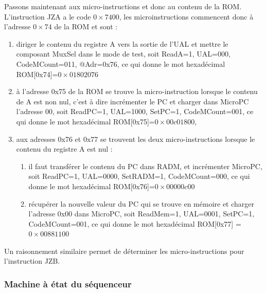 Passons maintenant aux micro-instructions et donc au contenu de la ROM. L'instruction JZA a le code $0\times 7400$, les microinstructions commencent donc à l'adresse $0\times74$ de la ROM et sont :
\begin{enumerate}
\item diriger le contenu du registre A vers la sortie de l'UAL et mettre le composant MuxSel dans le mode de test, soit ReadA=1, UAL=000, CodeMCount=011, @Adr=0x76, ce qui donne le mot hexadécimal ROM[0x74]=$0\times01802076$
\item à l'adresse 0x75 de la ROM se trouve la micro-instruction lorsque le contenu de A est non nul, c'est à dire incrémenter le PC et charger dans MicroPC l'adresse 00, soit ReadPC=1, UAL=1000, SetPC=1, CodeMCount=001, ce qui donne le mot hexadécimal ROM[0x75]=$0\times00c01800$,
\item aux adresses 0x76 et 0x77 se trouvent les deux micro-instructions lorsque le contenu du registre A est nul :
\begin{enumerate}
\item il faut transférer le contenu du PC dans RADM, et incrémenter MicroPC, soit ReadPC=1, UAL=0000, SetRADM=1, CodeMCount=000, ce qui donne le mot hexadécimal ROM[0x76]=$0\times00000c00$ 
\item récupérer la nouvelle valeur du PC qui se trouve en mémoire et charger l'adresse 0x00 dans MicroPC, soit ReadMem=1, UAL=0001, SetPC=1, CodeMCount=001, ce qui donne le mot hexadécimal ROM[0x77] = $0\times00881100$
\end{enumerate}
\end{enumerate}

Un raisonnement similaire permet de déterminer les micro-instructions pour l'instruction JZB.

\subsubsection{Machine à état du séquenceur}

